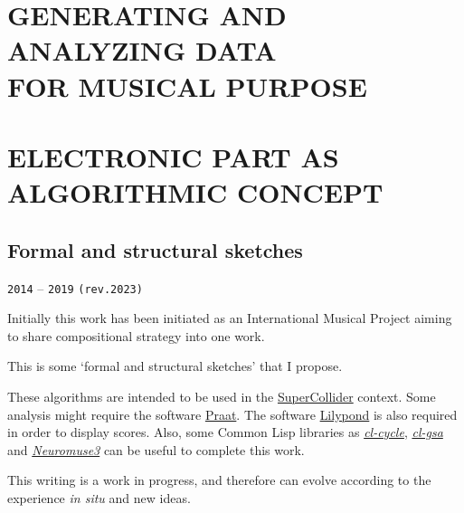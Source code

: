 \documentclass{book}
\begin{document}
\part[Generating and analyzing data for musical purpose]{GENERATING AND ANALYZING DATA\\ FOR MUSICAL PURPOSE}
\thispagestyle{empty}

\mainmatter







\part[Electronic part as algorithmic concept]{ELECTRONIC PART AS ALGORITHMIC CONCEPT}

 \chapter[Formal and structural sketches]{\huge Formal and structural sketches}
 \thispagestyle{empty}

\label{fss}
{\texttt{2014} -- \texttt{2019} \texttt{(rev.2023)} }

\bigskip
\smallskip
\bigskip

Initially  this work has been initiated  as an International Musical Project aiming to share compositional strategy into one work. 

This is some `formal and structural sketches' that I propose.

\bigskip

These algorithms are intended to be used in the \href{http://supercollider.github.io}{SuperCollider} context. Some analysis might require the software \href{http://www.fon.hum.uva.nl/praat}{Praat}. The software \href{http://lilypond.org/}{Lilypond} is also required in order to display scores. Also, some Common Lisp libraries as \href{https://github.com/yannics/cl-cycle}{\textsl{cl-cycle}}, \href{https://github.com/yannics/cl-gsa}{\textsl{cl-gsa}} and \href{https://bitbucket.org/yann\_ics/neuromuse3}{\textsl{Neuromuse3}} can be useful to complete this work.

\bigskip

This writing is a work in progress, and therefore can evolve according to the experience \textit{in situ} and new ideas. 

\smallskip
\end{document}
